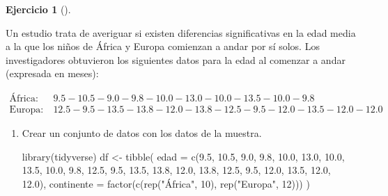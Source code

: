 \documentclass[
  a4paper,
]{scrreport}
\newenvironment{Shaded}{\begin{snugshade}}{\end{snugshade}}
\newcommand{\AttributeTok}[1]{\textcolor[rgb]{0.40,0.45,0.13}{#1}}
\newcommand{\DecValTok}[1]{\textcolor[rgb]{0.68,0.00,0.00}{#1}}
\newcommand{\FloatTok}[1]{\textcolor[rgb]{0.68,0.00,0.00}{#1}}
\newcommand{\FunctionTok}[1]{\textcolor[rgb]{0.28,0.35,0.67}{#1}}
\newcommand{\NormalTok}[1]{\textcolor[rgb]{0.00,0.23,0.31}{#1}}
\newcommand{\OtherTok}[1]{\textcolor[rgb]{0.00,0.23,0.31}{#1}}
\newcommand{\StringTok}[1]{\textcolor[rgb]{0.13,0.47,0.30}{#1}}
\theoremstyle{definition}
\newtheorem{exercise}{Ejercicio}[chapter]
\theoremstyle{remark}
\begin{document}
\begin{exercise}[]\protect\hypertarget{exr-contraste-hipotesis-media-edad-andar}{}\label{exr-contraste-hipotesis-media-edad-andar}

Un estudio trata de averiguar si existen diferencias significativas en
la edad media a la que los niños de África y Europa comienzan a andar
por sí solos. Los investigadores obtuvieron los siguientes datos para la
edad al comenzar a andar (expresada en meses):

\begin{align*}
\textrm{África}:& \ 9.5-10.5-9.0-9.8-10.0-13.0-10.0-13.5-10.0-9.8\\
\textrm{Europa}:& \ 12.5-9.5-13.5-13.8-12.0-13.8-12.5-9.5-12.0-13.5-12.0-12.0
\end{align*}

\begin{enumerate}
\def\labelenumi{\alph{enumi}.}
\item
  Crear un conjunto de datos con los datos de la muestra.

  \begin{tcolorbox}[enhanced jigsaw, coltitle=black, left=2mm, colback=white, leftrule=.75mm, toptitle=1mm, breakable, bottomrule=.15mm, titlerule=0mm, bottomtitle=1mm, title=\textcolor{quarto-callout-tip-color}{\faLightbulb}\hspace{0.5em}{Solución}, arc=.35mm, toprule=.15mm, rightrule=.15mm, colframe=quarto-callout-tip-color-frame, opacityback=0, colbacktitle=quarto-callout-tip-color!10!white, opacitybacktitle=0.6]

\begin{Shaded}
\begin{Highlighting}[]
\FunctionTok{library}\NormalTok{(tidyverse)}
\NormalTok{df }\OtherTok{\textless{}{-}} \FunctionTok{tibble}\NormalTok{(}
    \AttributeTok{edad =} \FunctionTok{c}\NormalTok{(}\FloatTok{9.5}\NormalTok{, }\FloatTok{10.5}\NormalTok{, }\FloatTok{9.0}\NormalTok{, }\FloatTok{9.8}\NormalTok{, }\FloatTok{10.0}\NormalTok{, }\FloatTok{13.0}\NormalTok{, }\FloatTok{10.0}\NormalTok{, }\FloatTok{13.5}\NormalTok{, }\FloatTok{10.0}\NormalTok{, }\FloatTok{9.8}\NormalTok{, }\FloatTok{12.5}\NormalTok{, }\FloatTok{9.5}\NormalTok{, }\FloatTok{13.5}\NormalTok{, }\FloatTok{13.8}\NormalTok{, }\FloatTok{12.0}\NormalTok{, }\FloatTok{13.8}\NormalTok{, }\FloatTok{12.5}\NormalTok{, }\FloatTok{9.5}\NormalTok{, }\FloatTok{12.0}\NormalTok{, }\FloatTok{13.5}\NormalTok{, }\FloatTok{12.0}\NormalTok{, }\FloatTok{12.0}\NormalTok{),}
    \AttributeTok{continente =} \FunctionTok{factor}\NormalTok{(}\FunctionTok{c}\NormalTok{(}\FunctionTok{rep}\NormalTok{(}\StringTok{"África"}\NormalTok{, }\DecValTok{10}\NormalTok{), }\FunctionTok{rep}\NormalTok{(}\StringTok{"Europa"}\NormalTok{, }\DecValTok{12}\NormalTok{)))}
\NormalTok{)}
\end{Highlighting}
\end{Shaded}


\end{tcolorbox}
\end{enumerate}
\end{exercise}
\end{document}
